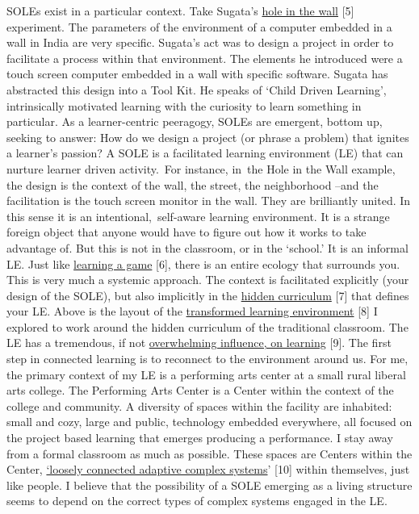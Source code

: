 SOLEs exist in a particular context. Take Sugata's
\href{http://www.ted.com/talks/sugata_mitra_shows_how_kids_teach_themselves.html}{hole
in the wall} {[}5{]} experiment. The parameters of the environment of a
computer embedded in a wall in India are very specific. Sugata's act was
to design a project in order to facilitate a process within that
environment. The elements he introduced were a touch screen computer
embedded in a wall with specific software. Sugata has abstracted this
design into a Tool Kit. He speaks of `Child Driven Learning',
intrinsically motivated learning with the curiosity to learn something
in particular. As a learner-centric peeragogy, SOLEs are emergent,
bottom up, seeking to answer: How do we design a project (or phrase a
problem) that ignites a learner's passion? A SOLE is a facilitated
learning environment (LE) that can nurture learner driven activity.~For
instance, in~the Hole in the Wall example, the design is the context of
the wall, the street, the neighborhood --and the facilitation is the
touch screen monitor in the wall. They are brilliantly united. In this
sense it is an intentional,~self-aware learning environment. It is a
strange foreign object that anyone would have to figure out how it works
to take advantage of. But this is not in the classroom, or in the
`school.' It is an informal LE. Just like
\href{http://www.academia.edu/1137269/Game-based_Learning_and_Intrinsic_Motivation}{learning
a game} {[}6{]}, there is an entire ecology that surrounds you. This is
very much a systemic approach. The context is facilitated explicitly
(your design of the SOLE), but also implicitly in the
\href{http://en.wikipedia.org/wiki/Hidden_curriculum}{hidden curriculum}
{[}7{]} that defines your LE. Above is the layout of the
\href{http://www.scribd.com/doc/181089012/Transformed-Learning-Environment-Analysis}{transformed
learning environment} {[}8{]} I explored to work around the hidden
curriculum of the traditional classroom. The LE has a tremendous, if not
\href{http://scholar.lib.vt.edu/theses/available/etd-09232007-220306/unrestricted/SElmasryETDbodytext.pdf}{overwhelming
influence, on learning} {[}9{]}. The first step in connected learning is
to reconnect to the environment around us. For me, the primary context
of my LE is a performing arts center at a small rural liberal arts
college. The Performing Arts Center is a Center within the context of
the college and community. A diversity of spaces within the facility are
inhabited: small and cozy, large and public, technology embedded
everywhere, all focused on the project based learning that emerges
producing a performance. I stay away from a formal classroom as much as
possible. These spaces are Centers within the Center,
\href{http://nourdiab.wordpress.com/2011/02/23/the-theories-of-christopher-alexander/}{`loosely
connected adaptive complex systems}' {[}10{]} within themselves, just
like people. I believe that the possibility of a SOLE emerging as a
living structure seems to depend on the correct types of complex systems
engaged in the LE.

